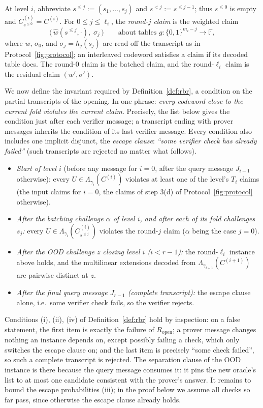 \documentclass[11pt]{article}
\newcommand{\F}{\mathbb{F}}
\newcommand{\Lam}{\Lambda}
\newcommand{\cube}[1]{\{0,1\}^{#1}}
\newcommand{\pol}[1]{\widehat{#1}}
\theoremstyle{plain}
\theoremstyle{definition}
\theoremstyle{remark}
\begin{document}
At level $i$, abbreviate $s^{\le j} := (s_1, \dots, s_j)$ and $s^{<j} := s^{\le j-1}$; thus $s^{\le 0}$ is empty and $C^{(i)}_{s^{\le 0}} = C^{(i)}$. For $0 \le j \le \ell_i$, the \emph{round-$j$ claim} is the weighted claim
\[
\bigl(\, \pol{w}(s^{\le j}, \cdot),\; \sigma_j \,\bigr) \qquad \text{about tables } g : \cube{m_i - j} \to \F,
\]
where $w$, $\sigma_0$, and $\sigma_j = h_j(s_j)$ are read off the transcript as in Protocol~\ref{fig:protocol}; an interleaved codeword satisfies a claim if its decoded table does. The round-$0$ claim is the batched claim, and the round-$\ell_i$ claim is the residual claim $(w', \sigma')$.

We now define the invariant required by Definition~\ref{def:rbr}, a condition on the partial transcripts of the opening. In one phrase: \emph{every codeword close to the current fold violates the current claim}. Precisely, the list below gives the condition just after each verifier message; a transcript ending with prover messages inherits the condition of its last verifier message. Every condition also includes one implicit disjunct, the \emph{escape clause}: \emph{``some verifier check has already failed''} (such transcripts are rejected no matter what follows).
\begin{itemize}[itemsep=1pt]
\item \emph{Start of level $i$} (before any message for $i = 0$, after the query message $J_{i-1}$ otherwise): every $U \in \Lam_{\gamma_i}(C^{(i)})$ violates at least one of the level's $T_i$ claims (the input claims for $i = 0$, the claims of step 3(d) of Protocol~\ref{fig:protocol} otherwise).
\item \emph{After the batching challenge $\alpha$ of level $i$, and after each of its fold challenges $s_j$:} every $U \in \Lam_{\gamma_i}(C^{(i)}_{s^{\le j}})$ violates the round-$j$ claim ($\alpha$ being the case $j = 0$).
\item \emph{After the OOD challenge $z$ closing level $i$ ($i < r-1$):} the round-$\ell_i$ instance above holds, and the multilinear extensions decoded from $\Lam_{\gamma_{i+1}}(C^{(i+1)})$ are pairwise distinct at $z$.
\item \emph{After the final query message $J_{r-1}$ (complete transcript):} the escape clause alone, i.e.\ some verifier check fails, so the verifier rejects.
\end{itemize}
Conditions (i), (ii), (iv) of Definition~\ref{def:rbr} hold by inspection: on a false statement, the first item is exactly the failure of $R_{\mathrm{open}}$; a prover message changes nothing an instance depends on, except possibly failing a check, which only switches the escape clause on; and the last item is precisely ``some check failed'', so such a complete transcript is rejected. The separation clause of the OOD instance is there because the query message consumes it: it pins the new oracle's list to at most one candidate consistent with the prover's answer. It remains to bound the escape probabilities (iii); in the proof below we assume all checks so far pass, since otherwise the escape clause already holds.
\end{document}
